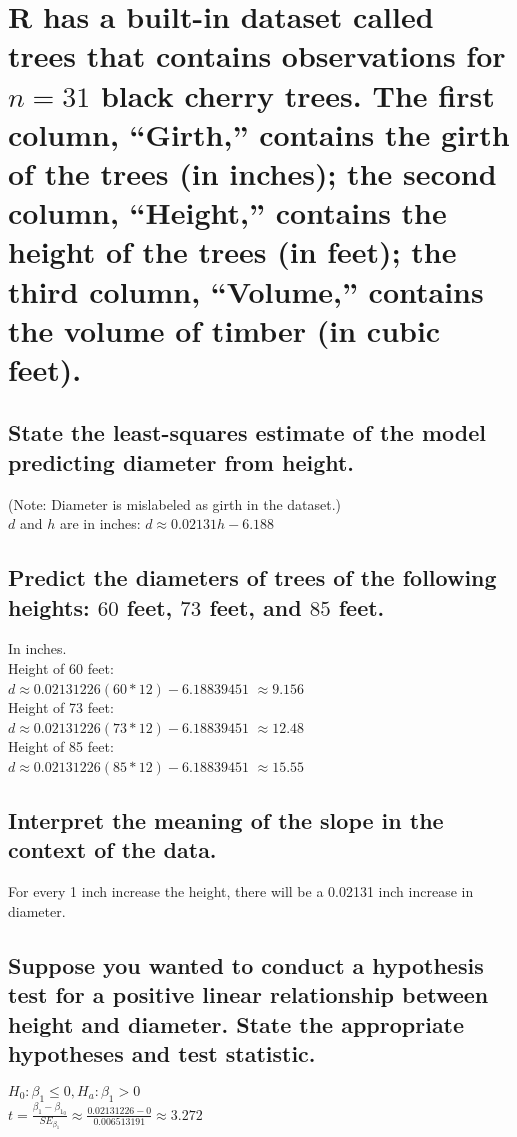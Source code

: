 \section{R has a built-in dataset called {\color{red} trees} that contains observations for 
    $n = 31$ black cherry
    trees. The first column, “Girth,” contains the girth of the trees (in inches); the second
    column, “Height,” contains the height of the trees (in feet); the third column, “Volume,”
    contains the volume of timber (in cubic feet).}
    \begin{multicols}{2}
        \subsection{State the least-squares estimate of the model predicting diameter from height.}
            (Note: Diameter is mislabeled as girth in the dataset.)\\
            $d$ and $h$ are in inches: $d \approx 0.02131h-6.188$

        \subsection{Predict the diameters of trees of the following heights: 
            $60$ feet, $73$ feet, and $85$ feet.}
            In inches.\\
            Height of 60 feet: \\
            $d \approx 0.02131226 (60 * 12)-6.18839451$
            $\approx 9.156$\\
            Height of 73 feet: \\
            $d \approx 0.02131226 (73 * 12)-6.18839451$
            $\approx 12.48$\\
            Height of 85 feet: \\
            $d \approx 0.02131226 (85 * 12)-6.18839451$
            $\approx 15.55$

        \subsection{Interpret the meaning of the slope in the context of the data.}
            For every 1 inch increase the height, 
            there will be a 0.02131 inch increase in diameter.

        \subsection{Suppose you wanted to conduct a hypothesis test for a positive linear relationship
            between height and diameter. State the appropriate hypotheses and test statistic.}
            $H_0: \beta_1 \leq 0, H_a: \beta_1 > 0$\\
            $t = \frac{\beta_1 - \beta_{1_0}}{SE_{\beta_1}}
            \approx \frac{0.02131226 - 0}{ 0.006513191} \approx 3.272$


\end{multicols}
